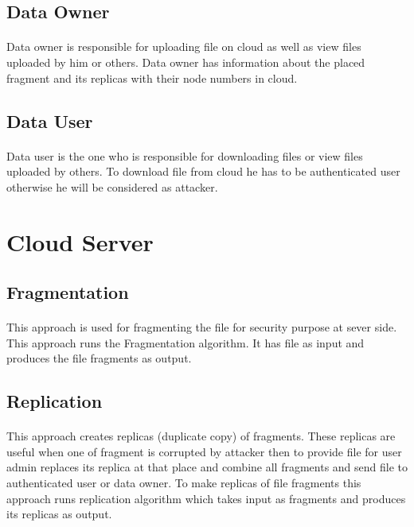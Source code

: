 \subsection{Data Owner}
\paragraph*{}
Data owner is responsible for uploading file on cloud as well as view files uploaded by him or others. Data owner has information about the placed fragment and its replicas with their node numbers in cloud. 
\subsection{Data User}
\paragraph*{}
Data user is the one who is responsible for downloading files or view files uploaded by others. To download file from cloud he has to be authenticated user otherwise he will be considered as attacker.
\section{Cloud Server}
\subsection{Fragmentation}
\paragraph*{}
This approach is used for fragmenting the file for security purpose at sever side. This approach runs the Fragmentation algorithm. It has file as input and produces the file fragments as output.

\subsection{Replication}
\paragraph*{}
This approach creates replicas (duplicate copy) of fragments. These replicas are useful
when one of fragment is corrupted by attacker then to provide file for user admin replaces
its replica at that place and combine all fragments and send file to authenticated user or
data owner. To make replicas of file fragments this approach runs replication algorithm
which takes input as fragments and produces its replicas as output.

